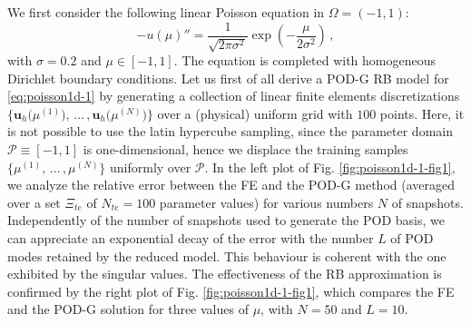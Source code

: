 \documentclass[12pt, a4paper, twoside, openright, notitlepage]{report}
\numberwithin{equation}{chapter}
\theoremstyle{theorem}
\theoremstyle{definition}
\theoremstyle{remark}
\theoremstyle{proposition}
\numberwithin{figure}{chapter}
\begin{document}
		We first consider the following linear Poisson equation in $\Omega = (-1,1)$:
		\begin{equation}
			\label{eq:poisson1d-1}
			- u(\mu)'' = \dfrac{1}{\sqrt{2 \pi \sigma^2}} \exp \left( -\dfrac{\mu}{2 \sigma^2} \right) \, ,
		\end{equation}
		with $\sigma = 0.2$ and $\mu \in [-1,1]$. The equation is completed with homogeneous Dirichlet boundary conditions. Let us first of all derive a POD-G RB model for \eqref{eq:poisson1d-1} by generating a collection of linear finite elements discretizations $\big\lbrace \mathbf{u}_h \big( \mu^{(1)} \big), \, \ldots \, , \mathbf{u}_h \big( \mu^{(N)} \big) \big\rbrace$ over a (physical) uniform grid with $100$ points. Here, it is not possible to use the latin hypercube sampling, since the parameter domain $\mathcal{P} \equiv [-1,1]$ is one-dimensional, hence we displace the training samples $\big\lbrace \mu^{(1)}, \, \ldots \, , \mu^{(N)} \big\rbrace$ uniformly over $\mathcal{P}$. In the left plot of Fig. \ref{fig:poisson1d-1-fig1}, we analyze the relative error between the FE and the POD-G method (averaged over a set $\Xi_{te}$ of $N_{te} = 100$ parameter values) for various numbers $N$ of snapshots. Independently of the number of snapshots used to generate the POD basis, we can appreciate an exponential decay of the error with the number $L$ of POD modes retained by the reduced model. This behaviour is coherent with the one exhibited by the singular values. The effectiveness of the RB approximation is confirmed by the right plot of Fig. \ref{fig:poisson1d-1-fig1}, which compares the FE and the POD-G solution for three values of $\mu$, with $N = 50$ and $L = 10$.
								
\end{document}
